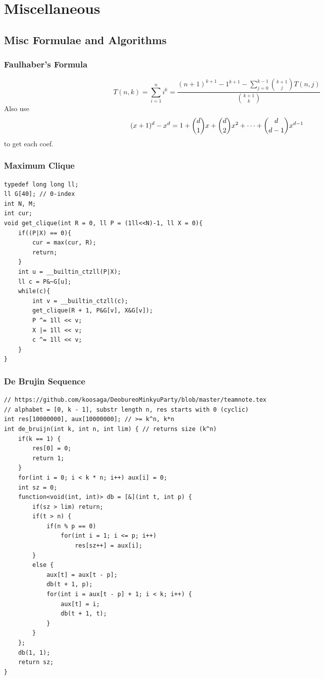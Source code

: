 \documentclass[landscape, 8pt, a4paper, oneside, twocolumn]{extarticle}
\begin{document}
\section{Miscellaneous}
\subsection{Misc Formulae and Algorithms}
\subsubsection{Faulhaber's Formula}
$$
T(n, k) = \sum_{i=1}^{n} i^k = \dfrac{(n+1)^{k+1} - 1^{k+1} - \sum_{j=0}^{k-1}\binom{k+1}{j}T(n, j)}{\binom{k+1}{k}}
$$
Also use 
$$
(x+1) ^ d - x ^ d = 1 + \dbinom{d}{1} x + \dbinom{d}{2} x^2 + \cdots + \dbinom{d}{d-1} x^{d-1}
$$
to get each coef.
\subsubsection{Maximum Clique}
\begin{verbatim}
typedef long long ll;
ll G[40]; // 0-index
int N, M;
int cur;
void get_clique(int R = 0, ll P = (1ll<<N)-1, ll X = 0){
    if((P|X) == 0){
        cur = max(cur, R);
        return;
    }
    int u = __builtin_ctzll(P|X);
    ll c = P&~G[u];
    while(c){
        int v = __builtin_ctzll(c);
        get_clique(R + 1, P&G[v], X&G[v]);
        P ^= 1ll << v;
        X |= 1ll << v;
        c ^= 1ll << v;
    }
}
\end{verbatim}
\subsubsection{De Brujin Sequence}
\begin{verbatim}
// https://github.com/koosaga/DeobureoMinkyuParty/blob/master/teamnote.tex
// alphabet = [0, k - 1], substr length n, res starts with 0 (cyclic)
int res[10000000], aux[10000000]; // >= k^n, k*n 
int de_bruijn(int k, int n, int lim) { // returns size (k^n)
    if(k == 1) {
        res[0] = 0;
        return 1;
    }
    for(int i = 0; i < k * n; i++) aux[i] = 0;
    int sz = 0;
    function<void(int, int)> db = [&](int t, int p) {
        if(sz > lim) return;
        if(t > n) {
            if(n % p == 0)
                for(int i = 1; i <= p; i++)
                    res[sz++] = aux[i];
        }
        else {
            aux[t] = aux[t - p];
            db(t + 1, p);
            for(int i = aux[t - p] + 1; i < k; i++) {
                aux[t] = i;
                db(t + 1, t);
            }
        }
    };
    db(1, 1);
    return sz;
}
\end{verbatim}
\end{document}
